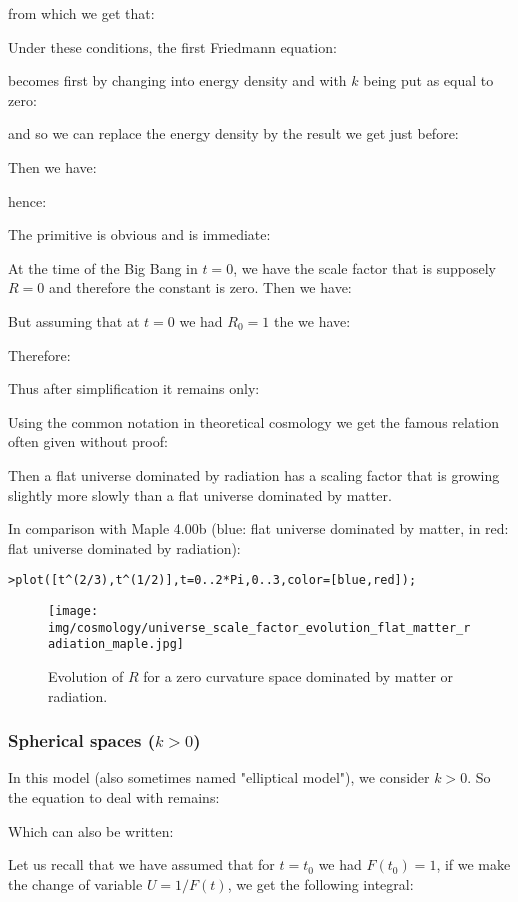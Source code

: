 	from which we get that:
	
	Under these conditions, the first Friedmann equation:
	
	becomes first by changing into energy density and with $k$ being put as equal to zero:
	
	and so we can replace the energy density by the result we get just before:
	
	Then we have:
	
	hence:
	
	The primitive is obvious and is immediate:
	
	At the time of the Big Bang in $t=0$, we have the scale factor that is supposely $R=0$ and therefore the constant is zero. Then we have:
	
	But assuming that at $t=0$ we had $R_0=1$ the we have:
	
	Therefore:
	
	Thus after simplification it remains only:
	
	Using the common notation in theoretical cosmology we get the famous relation often given without proof:
	
	Then a flat universe dominated by radiation has a scaling factor that is growing slightly more slowly than a flat universe dominated by matter.

	In comparison with Maple 4.00b (blue: flat universe dominated by matter, in red: flat universe dominated by radiation):

	\texttt{>plot([t\string^(2/3),t\string^(1/2)],t=0..2*Pi,0..3,color=[blue,red]);}\\
	\begin{figure}[H]
		\begin{center}
		\texttt{[image: img/cosmology/universe\_scale\_factor\_evolution\_flat\_matter\_radiation\_maple.jpg]}
		\end{center}	
		\caption[]{Evolution of $R$ for a zero curvature space dominated by matter or radiation.}
	\end{figure}
	
	\subsubsection{Spherical spaces ($k>0$)}
	In this model (also sometimes named "elliptical model"), we consider $k>0$. So the equation to deal with remains:
	
	Which can also be written:
	
	Let us recall that we have assumed that for $t=t_0$ we had $F(t_0)=1$, if we make the change of variable $U=1/F(t)$, we get the following integral:
	
